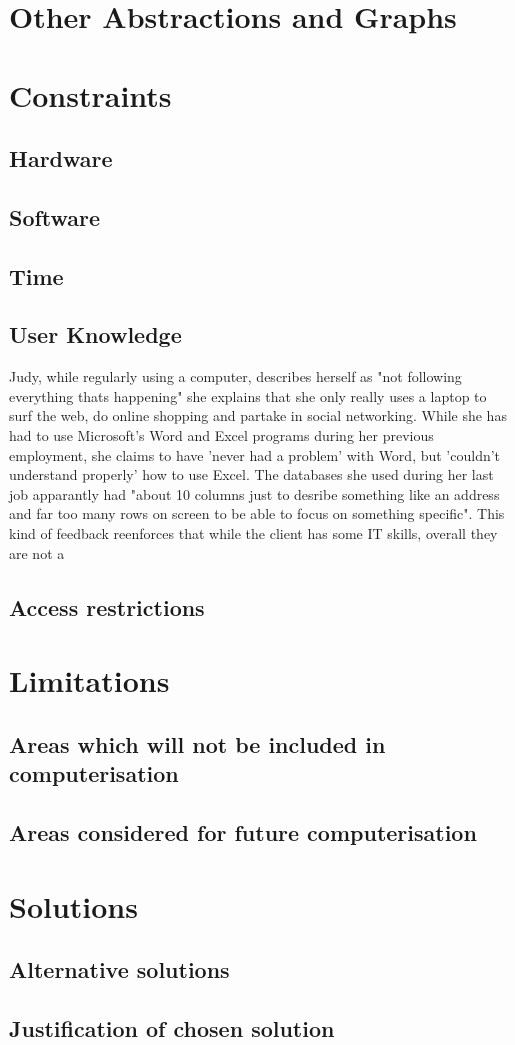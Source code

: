 \section{Other Abstractions and Graphs}

\section{Constraints}

\subsection{Hardware}

\subsection{Software}

\subsection{Time}

\subsection{User Knowledge}
Judy, while regularly using a computer, describes herself as "not following everything thats happening" she explains that she only really uses a laptop to surf the web, do online shopping and partake in social networking. While she has had to use Microsoft's Word and Excel programs during her previous employment, she claims to have 'never had a problem' with Word, but 'couldn't understand properly' how to use Excel. The databases she used during her last job apparantly had "about 10 columns just to desribe something like an address and far too many rows on screen to be able to focus on something specific". This kind of feedback reenforces that while the client has some IT skills, overall they are not a  
\subsection{Access restrictions}

\section{Limitations}

\subsection{Areas which will not be included in computerisation}

\subsection{Areas considered for future computerisation}

\section{Solutions}

\subsection{Alternative solutions}

\subsection{Justification of chosen solution}
